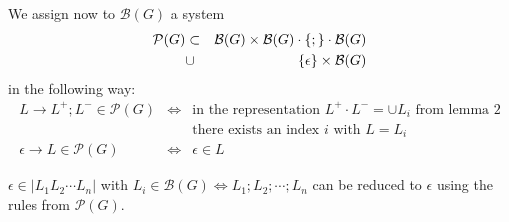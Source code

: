 We assign now to $\mathcal{B}(G)$ a system 
\begin{eqnarray*} 
\mathcal{P}(G) & \subset & \mathcal{B}(G) \times \mathcal{B}(G) \cdot \mbox{$\{;\}$}
\cdot \mathcal{B}(G) \\
& \cup & \mbox{$\{\epsilon\}$} \times \mathcal{B}(G)
\end{eqnarray*}
in the following way:
\begin{eqnarray*}
L \to L^+ ; L^- \in \mathcal{P}(G) & \iff & \text{in the representation } L^+
  \cdot L^- = \cup L_i \text{ from lemma 2} \\
  & & \text {there exists an index $i$ with $L = L_i$} \\
\epsilon \to L \in \mathcal{P}(G) & \iff & \epsilon \in L
\end{eqnarray*}

\bigskip
\begin{lemma}
$\epsilon \in |L_1 L_2 \cdots L_n|$ with $L_i \in \mathcal{B}(G) \iff
L_1;L_2;\cdots ;L_n$ can be reduced to $\epsilon$ using the rules from
$\mathcal{P}(G)$.
\end{lemma}

